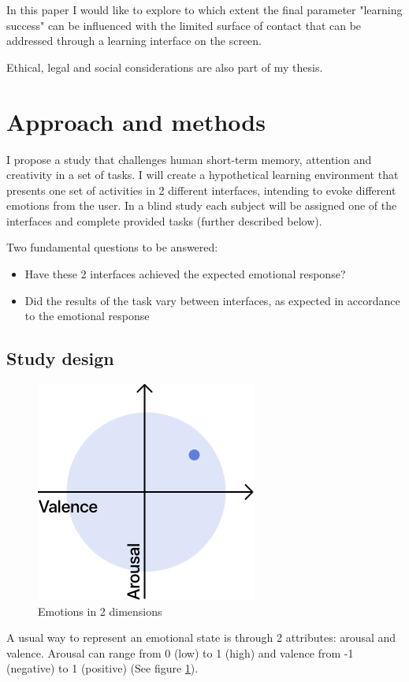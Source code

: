 In this paper I would like to explore to which extent the final parameter "learning success" can be influenced with the limited surface of contact that can be addressed through a learning interface on the screen.

Ethical, legal and social considerations are also part of my thesis.

\section{Approach and methods}

I propose a study that challenges human short-term memory, attention and creativity in a set of tasks. I will create a hypothetical learning environment that presents one set of activities in 2 different interfaces, intending to evoke different emotions from the user. In a blind study each subject will be assigned one of the interfaces and complete provided tasks (further described below).

Two fundamental questions to be answered:

\begin{itemize}
	\item Have these 2 interfaces achieved the expected emotional response?
	\item Did the results of the task vary between interfaces, as expected in accordance to the emotional response
\end{itemize}

\subsection{Study design}

\begin{figure}
	\centering
	\includegraphics[width=0.25\linewidth]{images/valence-arousal.png}
	\caption[Emotions in 2 dimensions]{Emotions in 2 dimensions}
	\label{fig:valence-arousal}
\end{figure}

A usual way to represent an emotional state is through 2 attributes: arousal and valence. Arousal can range from 0 (low) to 1 (high) and valence from -1 (negative) to 1 (positive) (See figure \ref{fig:valence-arousal}). 

